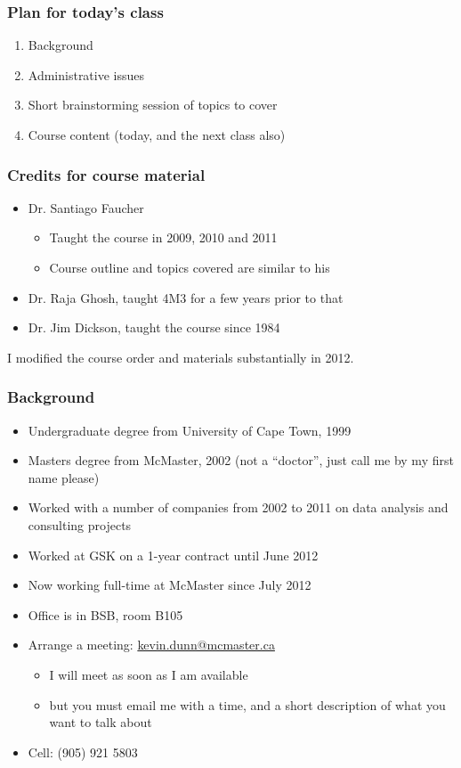 \begin{frame}\frametitle{Plan for today's class}
	\begin{enumerate}
		\item	Background
		\item	Administrative issues
		\item	Short brainstorming session of topics to cover
		\item	Course content (today, and the next class also)
	\end{enumerate}
\end{frame}

\begin{frame}\frametitle{Credits for course material}

	\begin{itemize}
		\item	Dr. Santiago Faucher
		\begin{itemize}
			\item	Taught the course in 2009, 2010 and 2011
			\item	Course outline and topics covered are similar to his
		\end{itemize}
		\item	Dr. Raja Ghosh, taught 4M3 for a few years prior to that
		\item	Dr. Jim Dickson, taught the course since 1984
	\end{itemize}
	
	\vspace{12pt}
	I modified the course order and materials substantially in 2012.%
\end{frame}

\begin{frame}\frametitle{Background}
	{\color{myGreen}{About myself}}
	\begin{itemize}
		\item	Undergraduate degree from University of Cape Town, 1999
		\item	Masters degree from McMaster, 2002 (not a ``doctor'', just call me by my first name please)
		\item	Worked with a number of companies from 2002 to 2011 on data analysis and consulting projects
		\item	Worked at GSK on a 1-year contract until June 2012
		\item	Now working full-time at McMaster since July 2012
		\item	Office is in BSB, room B105
		\item	Arrange a meeting: \url{kevin.dunn@mcmaster.ca}
			\begin{itemize}
				\item	I will meet as soon as I am available
				\item	but you must email me with a time, and a short description of what you want to talk about
			\end{itemize}
		\item	Cell: (905) 921 5803
	\end{itemize}
\end{frame}


